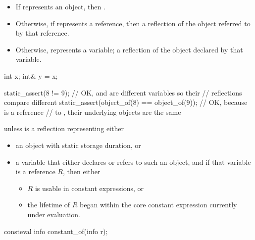\begin{itemdescr}
\pnum
\returns
\begin{itemize}
\item
  If  represents an object,
  then .
\item
  Otherwise, if  represents a reference,
  then a reflection of the object referred to by that reference.
\item
  Otherwise,  represents a variable;
  a reflection of the object declared by that variable.
\end{itemize}
\begin{example}
\begin{codeblock}
int x;
int& y = x;

static_assert(^^x != ^^y);                          // OK,  and  are different variables so their
                                                    // reflections compare different
static_assert(object_of(^^x) == object_of(^^y));    // OK, because  is a reference
                                                    // to , their underlying objects are the same
\end{codeblock}
\end{example}

\pnum
\throws
{} unless
 is a reflection representing either
\begin{itemize}
\item
  an object with static storage duration, or
\item
  a variable that either declares or refers to such an object,
  and if that variable is a reference $R$, then either
  \begin{itemize}
  \item
    $R$ is usable in constant expressions, or
  \item
    the lifetime of $R$ began within the core constant expression
    currently under evaluation.
  \end{itemize}
\end{itemize}
\end{itemdescr}

%
\begin{itemdecl}
consteval info constant_of(info r);
\end{itemdecl}

